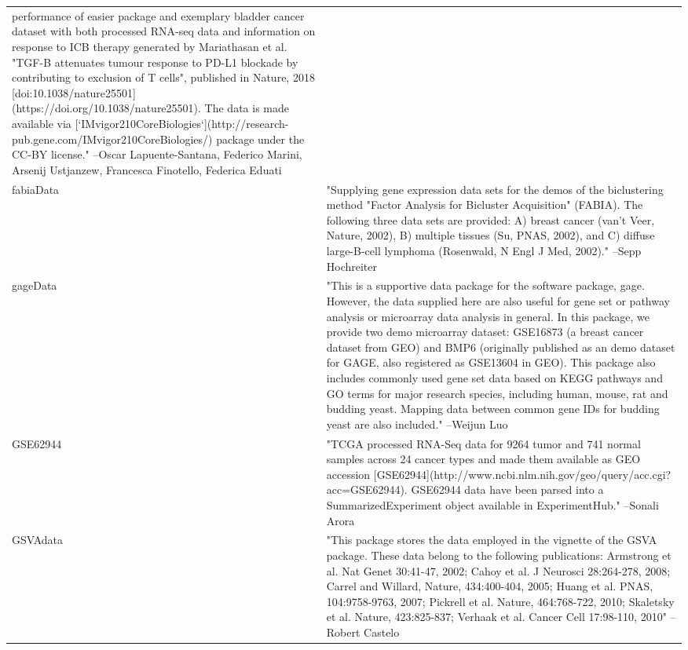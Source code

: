\begin{longtable}[t]{l>{\raggedright\arraybackslash}p{25em}}
performance of easier package and exemplary bladder cancer
dataset with both processed RNA-seq data and information on
response to ICB therapy generated by Mariathasan et al. "TGF-B
attenuates tumour response to PD-L1 blockade by contributing to
exclusion of T cells", published in Nature, 2018
[doi:10.1038/nature25501](https://doi.org/10.1038/nature25501).
The data is made available via
[`IMvigor210CoreBiologies`](http://research-pub.gene.com/IMvigor210CoreBiologies/)
package under the CC-BY license." --Oscar Lapuente-Santana, Federico Marini, Arsenij Ustjanzew, Francesca Finotello, Federica Eduati\\
fabiaData & "Supplying gene expression data sets for the demos of the
biclustering method "Factor Analysis for Bicluster Acquisition"
(FABIA). The following three data sets are provided: A) breast
cancer (van't Veer, Nature, 2002), B) multiple tissues (Su,
PNAS, 2002), and C) diffuse large-B-cell lymphoma (Rosenwald, N
Engl J Med, 2002)." --Sepp Hochreiter\\
gageData & "This is a supportive data package for the software
package, gage. However, the data supplied here are also useful
for gene set or pathway analysis or microarray data analysis in
general. In this package, we provide two demo microarray
dataset: GSE16873 (a breast cancer dataset from GEO) and BMP6
(originally published as an demo dataset for GAGE, also
registered as GSE13604 in GEO). This package also includes
commonly used gene set data based on KEGG pathways and GO terms
for major research species, including human, mouse, rat and
budding yeast. Mapping data between common gene IDs for budding
yeast are also included." --Weijun Luo\\
GSE62944 & "TCGA processed RNA-Seq data for 9264 tumor and 741 normal
samples across 24 cancer types and made them available as GEO
accession
[GSE62944](http://www.ncbi.nlm.nih.gov/geo/query/acc.cgi?acc=GSE62944).
GSE62944 data have been parsed into a SummarizedExperiment
object available in ExperimentHub." --Sonali Arora\\
GSVAdata & "This package stores the data employed in the vignette of
the GSVA package. These data belong to the following
publications: Armstrong et al. Nat Genet 30:41-47, 2002; Cahoy
et al. J Neurosci 28:264-278, 2008; Carrel and Willard, Nature,
434:400-404, 2005; Huang et al. PNAS, 104:9758-9763, 2007;
Pickrell et al. Nature, 464:768-722, 2010; Skaletsky et al.
Nature, 423:825-837; Verhaak et al. Cancer Cell 17:98-110, 2010" --Robert Castelo\\

\end{longtable}
